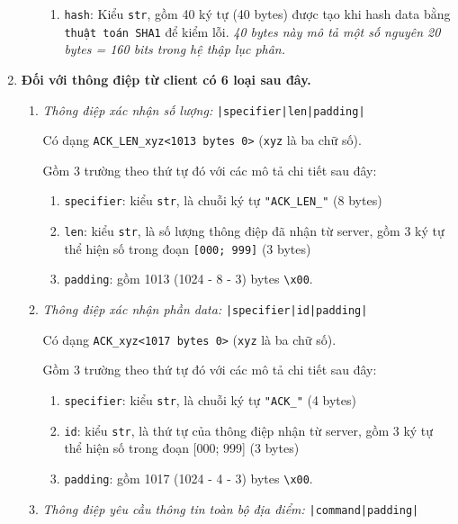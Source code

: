 \begin{enumerate}
\begin{enumerate}
\begin{enumerate}
\item \texttt{hash}: Kiểu \texttt{str}, gồm 40 ký tự (40 bytes) được tạo khi hash data bằng \texttt{thuật toán SHA1} để kiểm lỗi. \textit{40 bytes này mô tả một số nguyên 20 bytes = 160 bits trong hệ thập lục phân.}
\end{enumerate}


\end{enumerate}
\large
\item \textbf{Đối với thông điệp từ client có 6 loại sau đây.}
\normalsize

\begin{enumerate}
\item \textit{Thông điệp xác nhận số lượng:} \texttt{|specifier|len|padding|}

Có dạng \texttt{ACK{\_}LEN{\_}xyz<1013 bytes 0>} (\texttt{xyz} là ba chữ số).

Gồm 3 trường theo thứ tự đó với các mô tả chi tiết sau đây:

\begin{enumerate}
\item \texttt{specifier}: kiểu \texttt{str}, là chuỗi ký tự \texttt{"ACK\_{LEN}\_"} (8 bytes)
\item \texttt{len}: kiểu \texttt{str}, là số lượng thông điệp đã nhận từ server, gồm 3 ký tự thể hiện số trong đoạn \texttt{[000; 999]} (3 bytes)
\item \texttt{padding}: gồm 1013 (1024 - 8 - 3) bytes \texttt{\textbackslash x00}.
\end{enumerate}

\item \textit{Thông điệp xác nhận phần data:} \texttt{|specifier|id|padding|}

Có dạng \texttt{ACK{\_}xyz<1017 bytes 0>} (\texttt{xyz} là ba chữ số).

Gồm 3 trường theo thứ tự đó với các mô tả chi tiết sau đây:

\begin{enumerate}
\item \texttt{specifier}: kiểu \texttt{str}, là chuỗi ký tự \texttt{"ACK{\_}"} (4 bytes)
\item \texttt{id}: kiểu \texttt{str}, là thứ tự của thông điệp nhận từ server, gồm 3 ký tự thể hiện số trong đoạn [000; 999] (3 bytes)
\item \texttt{padding}: gồm 1017 (1024 - 4 - 3) bytes \texttt{\textbackslash x00}.
\end{enumerate}

\item \textit{Thông điệp yêu cầu thông tin toàn bộ địa điểm:} \texttt{|command|padding|}


\end{enumerate}
\end{enumerate}
